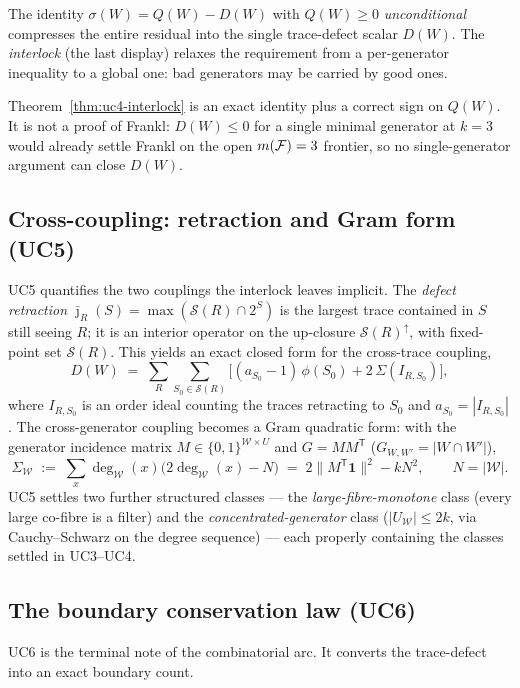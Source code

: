 The identity $\sigma(W)=Q(W)-D(W)$ with $Q(W)\ge0$
\emph{unconditional} compresses the entire residual into the single
trace-defect scalar $D(W)$. The \emph{interlock} (the last display)
relaxes the requirement from a per-generator inequality to a global
one: bad generators may be carried by good ones.

\begin{status}
Theorem~\ref{thm:uc4-interlock} is an exact identity plus a correct
sign on $Q(W)$. It is not a proof of Frankl: $D(W)\le0$ for a single
minimal generator at $k=3$ would already settle Frankl on the open
$m(\mathcal{F})=3$ frontier, so no single-generator argument can close $D(W)$.
\end{status}

\subsection{Cross-coupling: retraction and Gram form (UC5)}
\label{ssec:uc5}

UC5 quantifies the two couplings the interlock leaves implicit. The
\emph{defect retraction} $\bar\jmath_R(S)=\max(\mathcal S(R)\cap 2^S)$
is the largest trace contained in $S$ still seeing $R$; it is an
interior operator on the up-closure $\mathcal S(R)^\uparrow$, with
fixed-point set $\mathcal S(R)$. This yields an exact closed form for
the cross-trace coupling,
\[
  D(W)\;=\;\sum_{R}\sum_{S_0\in\mathcal S(R)}
  \bigl[(a_{S_0}-1)\,\phi(S_0)+2\,\Sigma(I_{R,S_0})\bigr],
\]
where $I_{R,S_0}$ is an order ideal counting the traces retracting to
$S_0$ and $a_{S_0}=|I_{R,S_0}|$. The cross-generator coupling becomes a
Gram quadratic form: with the generator incidence matrix $M\in
\{0,1\}^{\mathcal W\times U}$ and $G=MM^{\mathsf T}$
($G_{W,W'}=|W\cap W'|$),
\[
  \Sigma_{\mathcal W}\;:=\;\sum_{x}\deg_{\mathcal W}(x)\bigl(2
  \deg_{\mathcal W}(x)-N\bigr)\;=\;2\lVert M^{\mathsf
  T}\mathbf1\rVert^2-kN^2,\qquad N=|\mathcal W|.
\]
UC5 settles two further structured classes --- the
\emph{large-fibre-monotone} class (every large co-fibre is a filter)
and the \emph{concentrated-generator} class ($|U_{\mathcal W}|\le2k$,
via Cauchy--Schwarz on the degree sequence) --- each properly
containing the classes settled in UC3--UC4.

\subsection{The boundary conservation law (UC6)}
\label{ssec:uc6}

UC6 is the terminal note of the combinatorial arc. It converts the
trace-defect into an exact boundary count.

